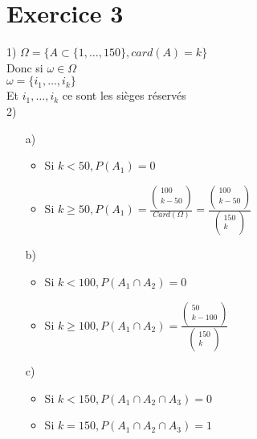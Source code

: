 \documentclass{article}
\author{Frederic Becerril}
\begin{document}
\part*{Exercice 3}

1) $\Omega = \{A \subset \{1, \dots, 150\}, card(A) = k\}$\\
Donc si $\omega \in \Omega$\\
$\omega = \{i_1, \dots, i_k\}$\\
Et $i_1, \dots, i_k$ ce sont les sièges réservés\\
2)
\begin{itemize}
    \item[a)]
    \begin{itemize}
        \item Si $k < 50, P(A_1) = 0$
        \item Si $k \geq 50, P(A_1) = \frac{\begin{pmatrix}
            100\\
            k - 50\\
        \end{pmatrix}}{Card(\Omega)} = \frac{\begin{pmatrix}
            100\\
            k - 50\\
        \end{pmatrix}}{\begin{pmatrix}
            150\\
            k\\
        \end{pmatrix}}$
    \end{itemize}
    \item[b)]
    \begin{itemize}
        \item Si $k < 100, P(A_1 \cap A_2) = 0$
        \item Si $k \geq 100, P(A_1 \cap A_2) = \frac{\begin{pmatrix}
            50\\
            k - 100\\
        \end{pmatrix}}{\begin{pmatrix}
            150\\
            k\\
        \end{pmatrix}}$
    \end{itemize}
    \item[c)]
    \begin{itemize}
        \item Si $k < 150, P(A_1 \cap A_2 \cap A_3) = 0$
        \item Si $k = 150, P(A_1 \cap A_2 \cap A_3) = 1$
    \end{itemize}
\end{itemize}
\end{document}
